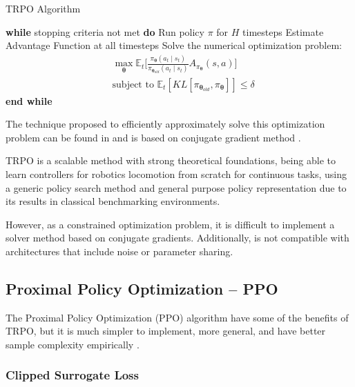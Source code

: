 \begin{algorithm}[!htbp]
	\caption{TRPO Algorithm}
	\begin{algorithmic}
		\STATE \textbf{while} stopping criteria not met \textbf{do}
		\STATE \hspace{5mm} Run policy $\pi$ for $H$ timesteps
		\STATE \hspace{5mm} Estimate Advantage Function at all timesteps
		\STATE \hspace{5mm} Solve the numerical optimization problem:
		\STATE \hspace{5mm} \begin{align*}
		&  \max_{\boldsymbol{\theta}}  \mathbb{E}_{t}\Big[\frac{\pi_{\boldsymbol{\theta}}(a_{t} \mid s_{t})}{\pi_{\boldsymbol{\theta}_{old}}(a_{t} \mid s_{t})}A_{\pi_{\boldsymbol{\theta}}}(s,a)\Big]\\ &  \text{subject to }  \mathbb{E}_{t}[KL[\pi_{\boldsymbol{\theta}_{old}}, \pi_{\boldsymbol{\theta}}]] \leq \delta \nonumber
		\end{align*} 
		\STATE \textbf{end while}
	\end{algorithmic}
	\label{alg:trpo}
\end{algorithm}

The technique proposed to efficiently approximately solve this optimization problem can be found in \cite{trpo} and is based on conjugate gradient method \cite{Hestenes&Stiefel:1952}.

TRPO is a scalable method with strong theoretical foundations, being able to learn controllers for robotics locomotion from scratch for continuous tasks, using a generic policy search method and general purpose policy representation due to its results in classical benchmarking environments.

However, as a constrained optimization problem, it is difficult to implement a solver method based on conjugate gradients. Additionally, is not compatible with architectures that include noise or parameter sharing.


\subsection{Proximal Policy Optimization -- PPO}

The Proximal Policy Optimization (PPO) algorithm have some of the benefits of TRPO, but it is much simpler to implement, more general, and have better sample
complexity empirically \cite{ppoalgorithm}.


\subsubsection{Clipped Surrogate Loss}


